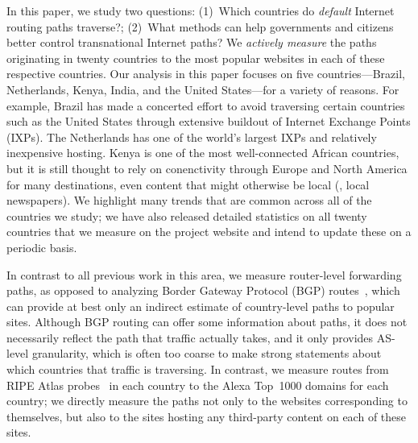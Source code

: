 In this paper, we study two questions: (1)~Which countries do {\em   default}
Internet routing paths traverse?; (2)~What methods can  help governments and
citizens better control transnational Internet paths?  We {\em actively
measure} the paths originating in twenty countries to the most popular
websites in each of these respective countries.
Our analysis in this paper focuses on five countries---Brazil, Netherlands,
Kenya, India, and the United States---for a variety of reasons.  For example,
Brazil has made a concerted effort to avoid traversing certain countries such
as the United States through extensive buildout of Internet Exchange Points
(IXPs). The Netherlands has one of the world's largest IXPs and relatively
inexpensive hosting. Kenya is one of the most well-connected African
countries, but it is still thought to rely on conenctivity through Europe and
North America for many destinations, even content that might otherwise be
local (\eg, local newspapers). We highlight many trends that are common across all
of the countries we study; we have also released detailed statistics on all twenty
countries that we measure on the project website and intend to update these on a
periodic basis.

In contrast to all previous work in this area, we measure router-level
forwarding paths, as opposed to analyzing Border Gateway Protocol (BGP)
routes~\cite{karlin2009nation,shah2015characterizing}, which can provide at
best only an indirect estimate of country-level paths to popular sites.
Although BGP routing can offer some information about paths, it does not
necessarily reflect the path that traffic actually takes, and it only provides
AS-level granularity, which is often too coarse to make strong statements
about which countries that traffic is traversing.  In contrast, we measure
routes from RIPE Atlas probes~\cite{ripe_atlas} in each country to the Alexa
Top~1000 domains for each country; we directly measure the paths not only to
the websites corresponding to themselves, but also to the sites hosting any
third-party content on each of these sites.

